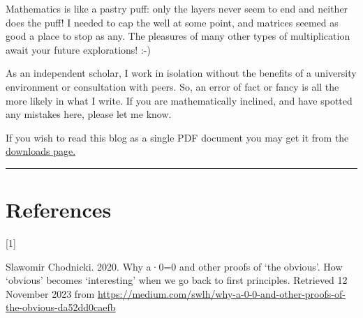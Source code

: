 \documentclass[
  a4paper,
]{article}
\newlength{\cslhangindent}
\newlength{\csllabelwidth}
\newlength{\cslentryspacingunit} %
\newenvironment{CSLReferences}[2] %
 {%
  \setlength{\parindent}{0pt}
  \ifodd #1
  \let\oldpar\par
  \def\par{\hangindent=\cslhangindent\oldpar}
  \fi
  \setlength{\parskip}{#2\cslentryspacingunit}
 }%
 {}
\newcommand{\CSLLeftMargin}[1]{\parbox[t]{\csllabelwidth}{#1}}
\newcommand{\CSLRightInline}[1]{\parbox[t]{\linewidth - \csllabelwidth}{#1}\break}
\begin{document}
Mathematics is like a pastry puff: only the layers never seem to end and
neither does the puff! I needed to cap the well at some point, and
matrices seemed as good a place to stop as any. The pleasures of many
other types of multiplication await your future explorations! :-)

As an independent scholar, I work in isolation without the benefits of a
university environment or consultation with peers. So, an error of fact
or fancy is all the more likely in what I write. If you are
mathematically inclined, and have spotted any mistakes here, please let
me know.

If you wish to read this blog as a single PDF document you may get it
from the \href{http://swanlotus.org/downloads}{downloads page.}

\begin{center}\rule{0.5\linewidth}{0.5pt}\end{center}

\hypertarget{bibliography}{%
\section*{References}\label{bibliography}}

\hypertarget{refs}{}
\begin{CSLReferences}{0}{0}
\leavevmode{}%
\CSLLeftMargin{{[}1{]} }%
\CSLRightInline{Slawomir Chodnicki. 2020. Why a·0=0 and other proofs of
{`the obvious'}. How {`obvious'} becomes {`interesting'} when we go back
to first principles. Retrieved 12 November 2023 from
\url{https://medium.com/swlh/why-a-0-0-and-other-proofs-of-the-obvious-da52dd0caefb}}

\end{CSLReferences}
\end{document}
